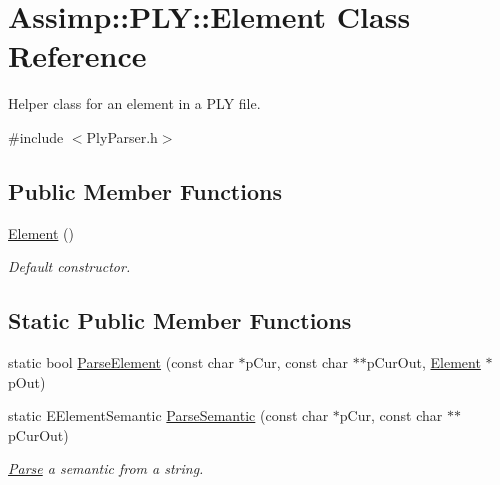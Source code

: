 \hypertarget{class_assimp_1_1_p_l_y_1_1_element}{\section{Assimp\+:\+:P\+L\+Y\+:\+:Element Class Reference}
\label{class_assimp_1_1_p_l_y_1_1_element}
}


Helper class for an element in a P\+L\+Y file.  




{\ttfamily \#include $<$Ply\+Parser.\+h$>$}

\subsection*{Public Member Functions}
\begin{DoxyCompactItemize}
\item 
\hypertarget{class_assimp_1_1_p_l_y_1_1_element_a31c6d81ba58a167927a4df612418cdc1}{\hyperlink{class_assimp_1_1_p_l_y_1_1_element_a31c6d81ba58a167927a4df612418cdc1}{Element} ()}\label{class_assimp_1_1_p_l_y_1_1_element_a31c6d81ba58a167927a4df612418cdc1}

\begin{DoxyCompactList}\small\item\em Default constructor. \end{DoxyCompactList}\end{DoxyCompactItemize}
\subsection*{Static Public Member Functions}
\begin{DoxyCompactItemize}
\item 
static bool \hyperlink{class_assimp_1_1_p_l_y_1_1_element_a9db63fb2c653876731ca4c404573a0e9}{Parse\+Element} (const char $\ast$p\+Cur, const char $\ast$$\ast$p\+Cur\+Out, \hyperlink{class_assimp_1_1_p_l_y_1_1_element}{Element} $\ast$p\+Out)
\item 
\hypertarget{class_assimp_1_1_p_l_y_1_1_element_a0f2569b8ff5cafa60989b1dbbd3b04ef}{static E\+Element\+Semantic \hyperlink{class_assimp_1_1_p_l_y_1_1_element_a0f2569b8ff5cafa60989b1dbbd3b04ef}{Parse\+Semantic} (const char $\ast$p\+Cur, const char $\ast$$\ast$p\+Cur\+Out)}\label{class_assimp_1_1_p_l_y_1_1_element_a0f2569b8ff5cafa60989b1dbbd3b04ef}

\begin{DoxyCompactList}\small\item\em \hyperlink{struct_parse}{Parse} a semantic from a string. \end{DoxyCompactList}\end{DoxyCompactItemize}

